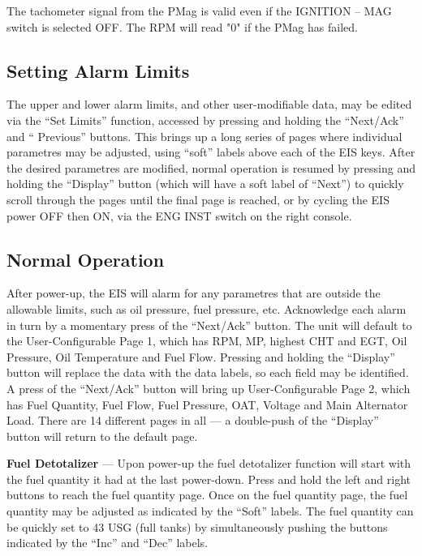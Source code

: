 \begin{Note}
{The tachometer signal from the PMag is valid even if the IGNITION -- MAG switch is selected OFF. The RPM will read "0" if the PMag has failed.} 
\end{Note}

\subsection*{Setting Alarm Limits}
The upper and lower alarm limits, and other user-modifiable data, may be edited via the ``Set Limits'' function, accessed by pressing and holding the ``Next/Ack'' and `` Previous'' buttons. This brings up a long series of pages where individual parametres may be adjusted, using ``soft'' labels above each of the EIS keys. After the desired parametres are modified, normal operation is resumed by pressing and holding the ``Display'' button (which will have a soft label of ``Next'') to quickly scroll through the pages until the final page is reached, or by cycling the EIS power OFF then ON, via the ENG INST switch on the right console.

\subsection*{Normal Operation}

After power-up, the EIS will alarm for any parametres that are outside the allowable limits, such as oil pressure, fuel pressure, etc. Acknowledge each alarm in turn by a momentary press of the ``Next/Ack'' button. The unit will default to the User-Configurable Page 1, which has RPM, MP, highest CHT and EGT, Oil Pressure, Oil Temperature and Fuel Flow. Pressing and holding the ``Display'' button will replace the data with the data labels, so each field may be identified. A press of the ``Next/Ack'' button will bring up User-Configurable Page 2, which has Fuel Quantity, Fuel Flow, Fuel Pressure, OAT, Voltage and Main Alternator Load. There are 14 different pages in all --- a double-push of the ``Display'' button will return to the default page.

\textbf{Fuel Detotalizer} --- Upon power-up the fuel detotalizer function will start with the fuel quantity it had at the last power-down. Press and hold the left and right buttons to reach the fuel quantity page. Once on the fuel quantity page, the fuel quantity may be adjusted as indicated by the ``Soft'' labels. The fuel quantity can be quickly set to 43 USG (full tanks) by simultaneously pushing the buttons indicated by the ``Inc'' and ``Dec'' labels.

